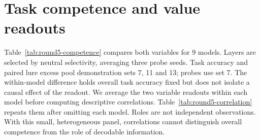 \newsavebox{\roundfivebox}
\section{Task competence and value readouts}
\label{app:round5-competence}
Table~\ref{tab:round5-competence} compares both variables for 9 models. Layers are selected by neutral selectivity, averaging three probe seeds. Task accuracy and paired lure excess pool demonstration sets 7, 11 and 13; probes use set 7. The within-model difference holds overall task accuracy fixed but does not isolate a causal effect of the readout.
We average the two variable readouts within each model before computing descriptive correlations. Table~\ref{tab:round5-correlation} repeats them after omitting each model. Roles are not independent observations. With this small, heterogeneous panel, correlations cannot distinguish overall competence from the role of decodable information.
